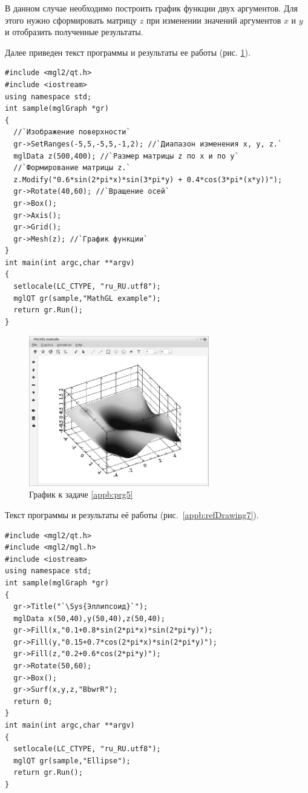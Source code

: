В данном случае необходимо построить график функции двух аргументов. Для этого нужно сформировать матрицу $z$ при
изменении значений аргументов $x$ и $y$ и отобразить полученные результаты.

Далее приведен текст программы и результаты ее работы (рис. \ref{appb:refDrawing6}).
\begin{lstlisting}
#include <mgl2/qt.h>
#include <iostream>
using namespace std;
int sample(mglGraph *gr)
{
  //`Изображение поверхности`
  gr->SetRanges(-5,5,-5,5,-1,2); //`Диапазон изменения x, y, z.`
  mglData z(500,400); //`Размер матрицы z по х и по y`
  //`Формирование матрицы z.`
  z.Modify("0.6*sin(2*pi*x)*sin(3*pi*y) + 0.4*cos(3*pi*(x*y))");
  gr->Rotate(40,60); //`Вращение осей`
  gr->Box(); 
  gr->Axis(); 
  gr->Grid();
  gr->Mesh(z); //`График функции`
}
int main(int argc,char **argv)
{
  setlocale(LC_CTYPE, "ru_RU.utf8");
  mglQT gr(sample,"MathGL example");
  return gr.Run();
}
\end{lstlisting}

\begin{figure}[htb]
\begin{center}
\includegraphics[width=0.7\textwidth]{img/ris_appb_7}
\caption{График к задаче \ref{appb:prg5}}
\label{appb:refDrawing6}
\end{center}
\end{figure}


Текст программы и результаты её работы (рис.~\ref{appb:refDrawing7}).
\begin{lstlisting}
#include <mgl2/qt.h>
#include <mgl2/mgl.h>
#include <iostream>
using namespace std;
int sample(mglGraph *gr)
{  
  gr->Title("`\Sys{Эллипсоид}`");
  mglData x(50,40),y(50,40),z(50,40);
  gr->Fill(x,"0.1+0.8*sin(2*pi*x)*sin(2*pi*y)");
  gr->Fill(y,"0.15+0.7*cos(2*pi*x)*sin(2*pi*y)");
  gr->Fill(z,"0.2+0.6*cos(2*pi*y)");
  gr->Rotate(50,60);
  gr->Box();
  gr->Surf(x,y,z,"BbwrR");
  return 0;
}
int main(int argc,char **argv)
{  
  setlocale(LC_CTYPE, "ru_RU.utf8");
  mglQT gr(sample,"Ellipse");
  return gr.Run();
}
\end{lstlisting}



